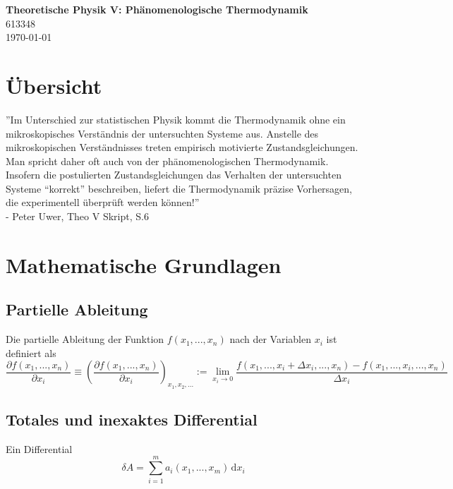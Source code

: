 \documentclass{article}
\newcommand{\diff}{\mathrm{d}}
\newcommand{\lr}[1]{\left(#1\right)}
\begin{document}
\begin{center}
	\Large{\textbf{Theoretische Physik V: Phänomenologische Thermodynamik}}\\
	\small{613348}\\
	\small{\today}
\end{center}

\tableofcontents


\newpage


\section*{Übersicht}
''Im Unterschied zur statistischen Physik kommt die Thermodynamik ohne ein mikroskopisches Verständnis der untersuchten Systeme aus. Anstelle des mikroskopischen Verständnisses treten empirisch motivierte Zustandsgleichungen. Man spricht daher oft auch von der phänomenologischen Thermodynamik. Insofern die postulierten Zustandsgleichungen das Verhalten der untersuchten Systeme “korrekt” beschreiben, liefert die Thermodynamik präzise Vorhersagen, die experimentell überprüft werden können!''\\
- Peter Uwer, Theo V Skript, S.6


\newpage


\section{Mathematische Grundlagen}
\subsection{Partielle Ableitung}
Die partielle Ableitung der Funktion $f(x_1, ..., x_n)$ nach der Variablen $x_i$ ist definiert als
	\begin{equation}
		\frac{ \partial f(x_1, ..., x_n) }{ \partial x_i } \equiv \lr{ \frac{ \partial f(x_1, ..., x_n) }{ \partial x_i } }_{x_1, x_2, ...} := \lim_{x_i \to 0} \frac{ f(x_1, ..., x_i + \Delta x_i, ..., x_n ) - f(x_1, ..., x_i, ..., x_n ) }{ \Delta x_i }
	\end{equation}
	

\subsection{Totales und inexaktes Differential}
Ein Differential
	\begin{equation}
		\delta A = \sum_{i=1}^m a_i(x_1, ..., x_m) \, \diff x_i
	\end{equation}
\end{document}
